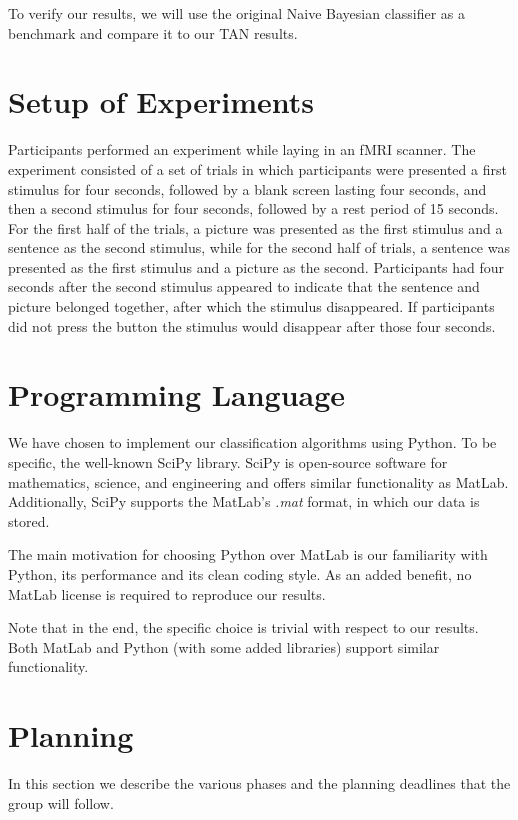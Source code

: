 \documentclass[a4paper, 11pt]{scrartcl}
\begin{document}
To verify our results, we will use the original Naive Bayesian classifier as a benchmark and compare it to our TAN results.

\section{Setup of Experiments}
\label{sec:setup}

Participants performed an experiment while laying in an fMRI scanner. The experiment consisted of a set of trials in which participants were presented a first stimulus for four seconds, followed by a blank screen lasting four seconds, and then a second stimulus for four seconds, followed by a rest period of 15 seconds. For the first half of the trials, a picture was presented as the first stimulus and a sentence as the second stimulus, while for the second half of trials, a sentence was presented as the first stimulus and a picture as the second. Participants had four seconds after the second stimulus appeared to indicate that the sentence and picture belonged together, after which the stimulus disappeared. If participants did not press the button the stimulus would disappear after those four seconds.

\section{Programming Language}
\label{sec:language}

We have chosen to implement our classification algorithms using Python. To be specific,  the well-known SciPy library. SciPy is open-source software for mathematics, science, and engineering and offers similar functionality as MatLab. Additionally, SciPy supports the MatLab's \textit{.mat} format, in which our data is stored.

The main motivation for choosing Python over MatLab is our familiarity with Python, its performance and its clean coding style. As an added benefit, no MatLab license is required to reproduce our results.

Note that in the end, the specific choice is trivial with respect to our results. Both MatLab and Python (with some added libraries) support similar functionality.

\section{Planning}

In this section we describe the various phases and the planning deadlines that the group will follow.
\end{document}
